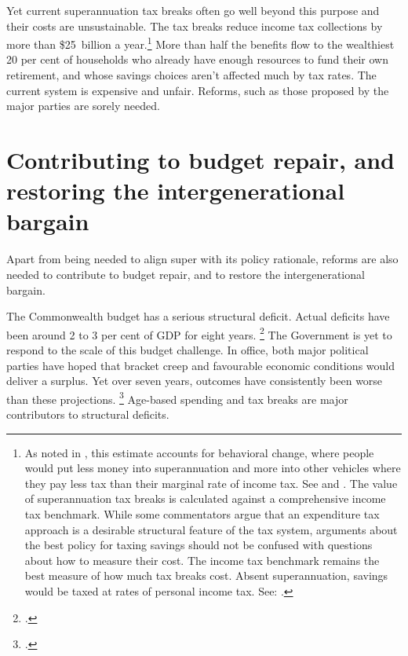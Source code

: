 \documentclass[continuous]{grattan}\usepackage[]{graphicx}\usepackage[]{color}
\begin{document}
Yet current superannuation tax breaks often go well beyond this purpose and their costs are unsustainable.
The tax breaks reduce income tax collections by more than \$25~billion a year.\footnote{As noted in , this estimate accounts for behavioral change, where people would put less money into superannuation and more into other vehicles where they pay less tax than their marginal rate of income tax. See \textcite{DaleyWoodCoates2015} and \textcite[][23--24]{DaleyCoatesWoodEtAl2015Super}. %
The value of superannuation tax breaks is calculated against a
comprehensive income tax benchmark. While some commentators argue that an
expenditure tax approach is a desirable structural feature of the tax system,
arguments about the best policy for taxing savings should not be confused with
questions about how to measure their cost. The income tax benchmark remains
the best measure of how much tax breaks cost. Absent superannuation, savings
would be taxed at rates of personal income tax. See: \textcite[][Box~1]{DaleyCoatesWoodEtAl2015Super}.
} 
More than half the benefits flow to the wealthiest 20 per cent of households who already have enough resources to fund their own retirement, and whose savings choices aren't affected much by tax rates. %
The current system is expensive and unfair. 
Reforms, such as those proposed by the major parties are sorely needed.

\section{Contributing to budget repair, and restoring the intergenerational bargain}\label{sec:contributing-to-budget-repair-and-restoring-the-intergenerational-bargain}

Apart from being needed to align super with its policy rationale, \mbox{reforms} are also needed to contribute to budget repair, and to restore the intergenerational bargain.

The Commonwealth budget has a serious structural deficit.
Actual deficits have been around 2 to 3 per cent of GDP for eight years.%
\footcite[][4]{DaleyWood2015FiscalChallenges} %
The Government is yet to respond to the scale of this budget challenge.
In office, both major political parties have hoped that bracket creep and favourable economic conditions would deliver a surplus.
Yet over seven years, outcomes have consistently been worse than these projections.%
\footcite{DaleyWood-2016-theConvo-3-critical-tests-for-budget-2016} %
Age-based spending and tax breaks are major contributors to structural deficits. 
\end{document}
